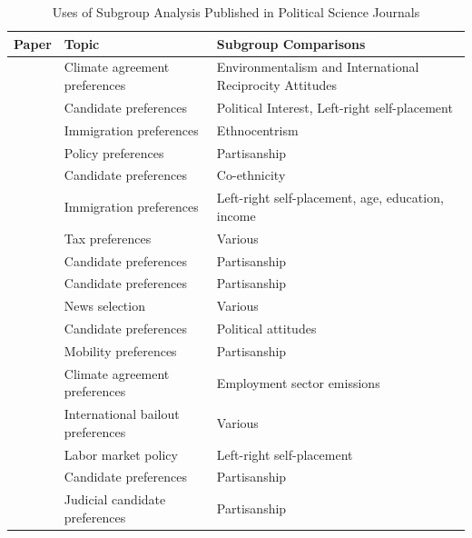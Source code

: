 \documentclass[a4paper,12pt]{article}\usepackage[]{graphicx}\usepackage[]{color}
\begin{document}
\begin{table}
\caption{Uses of Subgroup Analysis Published in Political Science Journals}\label{tab:papers}
\begin{center}
\footnotesize
\begin{tabular}{p{2in} p{2in} p{2in}}\toprule
\textbf{Paper} & \textbf{Topic} & \textbf{Subgroup Comparisons} \\ \midrule
\citet{BechtelScheve2013} & Climate agreement preferences & Environmentalism and International Reciprocity Attitudes \\ \midrule
\citet{FranchinoZucchini2014} & Candidate preferences & Political Interest, Left-right self-placement\\ \midrule
\citet{HainmuellerHopkinsYamamoto2014} & Immigration preferences & Ethnocentrism \\ \midrule
\citet{HansenOlsenBech2014} & Policy preferences & Partisanship \\ \midrule
\citet{Carlson2015} & Candidate preferences & Co-ethnicity \\ \midrule
\citet{BansakHainmuellerHangartner2016} & Immigration preferences & Left-right self-placement, age, education, income\\ \midrule
\citet{BallardRosaMartinScheve2016} & Tax preferences & Various\\ \midrule
\citet{Campbelletal2016} & Candidate preferences & Partisanship \\ \midrule
\citet{CarnesLupu2016} & Candidate preferences & Partisanship \\ \midrule
\citet{Mummolo2016} & News selection & Various\\ \midrule
\citet{VivyanWagner2016} & Candidate preferences & Political attitudes \\ \midrule
\citet{MummoloNall2017} & Mobility preferences & Partisanship \\ \midrule
\citet{BechtelGenoveseScheve2017} & Climate agreement preferences & Employment sector emissions \\ \midrule
\citet{BechtelHainmuellerMargalit2017} & International bailout preferences & Various\\ \midrule
\citet{GallegoMarx2017} & Labor market policy & Left-right self-placement \\ \midrule
\citet{KirklandCoppock2017} & Candidate preferences & Partisanship \\ \midrule
\citet{Sen2017} & Judicial candidate preferences & Partisanship \\ \midrule

\end{tabular}
\end{center}
\end{table}
\end{document}
